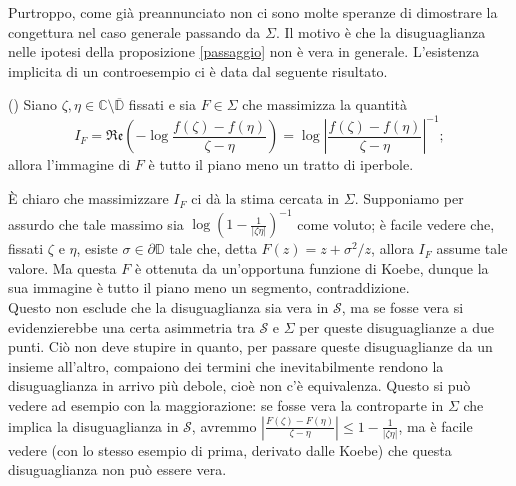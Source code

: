 Purtroppo, come già preannunciato non ci sono molte speranze di dimostrare la congettura nel caso generale passando da $\Sigma$. Il motivo è che la disuguaglianza nelle ipotesi della proposizione \ref{passaggio} non è vera in generale. L'esistenza implicita di un controesempio ci è data dal seguente risultato.

\begin{thm}
  (\cite[Chapter IV.3, Theorem 2]{Gol1}) Siano $\zeta, \eta \in \mathbb{C}\setminus\overline{\mathbb{D}}$ fissati e sia $F \in \Sigma$ che massimizza la quantità
  $$I_F=\mathfrak{Re}\left(-\log\frac{f(\zeta)-f(\eta)}{\zeta-\eta}\right)=\log\left|\frac{f(\zeta)-f(\eta)}{\zeta-\eta}\right|^{-1};$$
  allora l'immagine di $F$ è tutto il piano meno un tratto di iperbole.
\end{thm}

È chiaro che massimizzare $I_F$ ci dà la stima cercata in $\Sigma$. Supponiamo per assurdo che tale massimo sia $\log\left(1-\frac{1}{|\zeta\eta|}\right)^{-1}$ come voluto; è facile vedere che, fissati $\zeta$ e $\eta$, esiste $\sigma \in \partial\mathbb{D}$ tale che, detta $F(z)=z+\sigma^2/z$, allora $I_F$ assume tale valore. Ma questa $F$ è ottenuta da un'opportuna funzione di Koebe, dunque la sua immagine è tutto il piano meno un segmento, contraddizione. \\

Questo non esclude che la disuguaglianza sia vera in $\mathcal{S}$, ma se fosse vera si evidenzierebbe una certa asimmetria tra $\mathcal{S}$ e $\Sigma$ per queste disuguaglianze a due punti. Ciò non deve stupire in quanto, per passare queste disuguaglianze da un insieme all'altro, compaiono dei termini che inevitabilmente rendono la disuguaglianza in arrivo più debole, cioè non c'è equivalenza. Questo si può vedere ad esempio con la maggiorazione: se fosse vera la controparte in $\Sigma$ che implica la disuguaglianza in $\mathcal{S}$, avremmo $\left|\frac{F(\zeta)-F(\eta)}{\zeta-\eta}\right| \le 1-\frac{1}{|\zeta\eta|}$, ma è facile vedere (con lo stesso esempio di prima, derivato dalle Koebe) che questa disuguaglianza non può essere vera.

